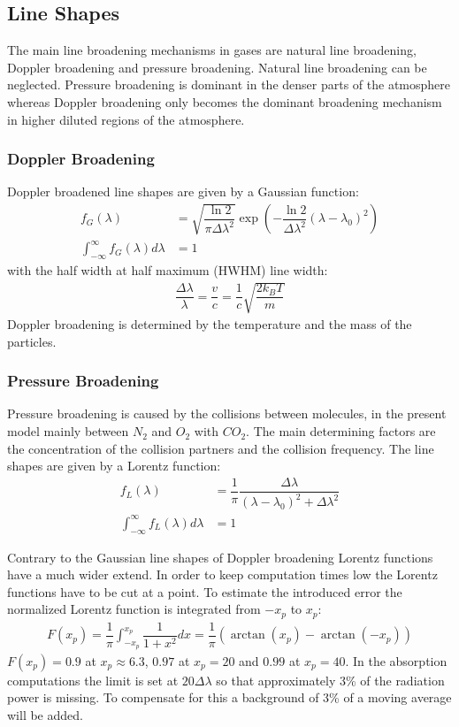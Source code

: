 \subsection{Line Shapes}

The main line broadening mechanisms in gases are natural line broadening, Doppler broadening and pressure broadening. Natural line broadening can be neglected. Pressure broadening is dominant in the denser parts of the atmosphere whereas Doppler broadening only becomes the dominant broadening mechanism in higher diluted regions of the atmosphere.

\subsubsection{Doppler Broadening}

Doppler broadened line shapes are given by a Gaussian function:
\begin{align}
	f_G(\lambda) &= \sqrt{\dfrac{\ln 2}{\pi \Delta \lambda^2}}  
		\exp \left(- \dfrac{\ln 2}{\Delta \lambda^2}  \left(\lambda - \lambda_0\right)^2 \right) \\
			\int_{-\infty}^{\infty}  f_G(\lambda) d\lambda &= 1
\end{align}
with the half width at half maximum (HWHM) line width:
\begin{align}
\dfrac{\Delta \lambda}{\lambda} = \dfrac{v}{c} = \dfrac{1}{c} \sqrt{\dfrac{2 k_B T}{m}}
\end{align}
Doppler broadening is  determined by the temperature and the mass of the particles.

\subsubsection{Pressure Broadening}

Pressure broadening is caused by the collisions between molecules, in the present model mainly between $N_2$ and $O_2$ with $CO_2$. 
The main determining factors are the concentration of the collision partners and the collision frequency. The line shapes are given by a Lorentz function:
\begin{align}
	f_L(\lambda) &= \dfrac{1}{\pi} \dfrac{\Delta \lambda}{ (\lambda - \lambda_0)^2 + \Delta \lambda^2} \\
	\int_{-\infty}^{\infty}  f_L(\lambda) d\lambda &= 1
\end{align}

Contrary to the Gaussian line shapes of Doppler broadening Lorentz functions have a much wider extend. In order to keep computation times low the Lorentz functions have to be cut at a point. To estimate the introduced error the normalized Lorentz function is integrated from $-x_p$ to $x_p$:
\begin{align}
	F(x_p) = \dfrac{1}{\pi} \int_{-x_p}^{x_p} \dfrac{1}{1 + x^2} dx = \dfrac{1}{\pi} \left(\arctan(x_p) - \arctan(-x_p)\right)
\end{align}
$F(x_p) = 0.9$ at $x_p \approx 6.3$, $0.97$ at $x_p = 20$ and $0.99$ at $x_p = 40$. In the absorption computations the limit is set at  $20 \Delta \lambda$ so that approximately 3\% of the radiation power is missing. To compensate for this a background of 3\% of a moving average will be added.

